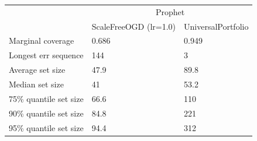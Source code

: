 \begin{tabular}{lll}
\toprule
& \multicolumn{2}{c}{Prophet} \\
& ScaleFreeOGD (lr=1.0) & UniversalPortfolio \\
\midrule
Marginal coverage & 0.686 & 0.949 \\
Longest err sequence & 144 & 3 \\
Average set size & 47.9 & 89.8 \\
Median set size & 41 & 53.2 \\
75\% quantile set size & 66.6 & 110 \\
90\% quantile set size & 84.8 & 221 \\
95\% quantile set size & 94.4 & 312 \\
\bottomrule
\end{tabular}

